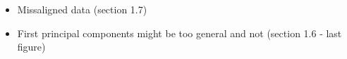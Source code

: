 \begin{itemize}
	\item Missaligned data \cite{brunton2019data} (section 1.7)
	\item First principal components might be too general and not \cite{brunton2019data} (section 1.6 - last figure)
\end{itemize}
